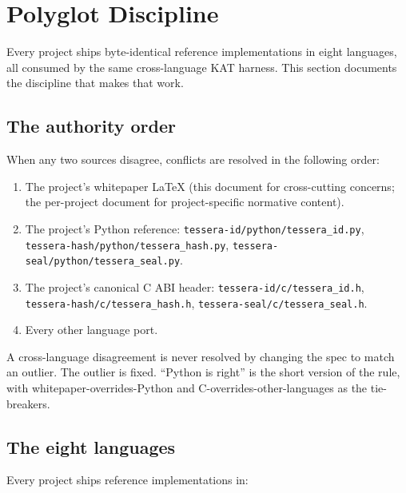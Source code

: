 \section{Polyglot Discipline}
\label{sec:polyglot}

Every \tessera{} project ships byte-identical reference implementations in eight languages, all consumed by the same cross-language KAT harness. This section documents the discipline that makes that work.

\subsection{The authority order}

When any two sources disagree, conflicts are resolved in the following order:

\begin{enumerate}
\item The project's whitepaper LaTeX (this document for cross-cutting concerns; the per-project document for project-specific normative content).
\item The project's Python reference: \texttt{tessera-id/python/tessera\_id.py}, \texttt{tessera-hash/python/tessera\_hash.py}, \texttt{tessera-seal/python/tessera\_seal.py}.
\item The project's canonical C ABI header: \texttt{tessera-id/c/tessera\_id.h}, \texttt{tessera-hash/c/tessera\_hash.h}, \texttt{tessera-seal/c/tessera\_seal.h}.
\item Every other language port.
\end{enumerate}

A cross-language disagreement is never resolved by changing the spec to match an outlier. The outlier is fixed. ``Python is right'' is the short version of the rule, with whitepaper-overrides-Python and C-overrides-other-languages as the tie-breakers.

\subsection{The eight languages}

Every project ships reference implementations in:

